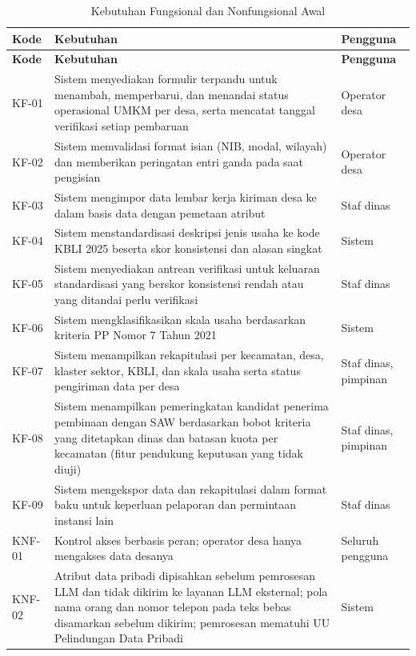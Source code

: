 {\footnotesize
\setlength{\tabcolsep}{4pt}
\renewcommand{\arraystretch}{1.15}
\begin{longtable}{|>{\centering\arraybackslash}p{}|L{0.62\textwidth}|L{0.20\textwidth}|}
\caption{Kebutuhan Fungsional dan Nonfungsional Awal}
\label{tab:kebutuhan}\\
\hline
\textbf{Kode} & \textbf{Kebutuhan} & \textbf{Pengguna} \\ \hline
\endfirsthead
\hline
\textbf{Kode} & \textbf{Kebutuhan} & \textbf{Pengguna} \\ \hline
\endhead
KF-01 & Sistem menyediakan formulir terpandu untuk menambah, memperbarui, dan menandai status operasional UMKM per desa, serta mencatat tanggal verifikasi setiap pembaruan & Operator desa \\ \hline
KF-02 & Sistem memvalidasi format isian (NIB, modal, wilayah) dan memberikan peringatan entri ganda pada saat pengisian & Operator desa \\ \hline
KF-03 & Sistem mengimpor data lembar kerja kiriman desa ke dalam basis data dengan pemetaan atribut & Staf dinas \\ \hline
KF-04 & Sistem menstandardisasi deskripsi jenis usaha ke kode KBLI 2025 beserta skor konsistensi dan alasan singkat & Sistem \\ \hline
KF-05 & Sistem menyediakan antrean verifikasi untuk keluaran standardisasi yang berskor konsistensi rendah atau yang ditandai perlu verifikasi & Staf dinas \\ \hline
KF-06 & Sistem mengklasifikasikan skala usaha berdasarkan kriteria PP Nomor 7 Tahun 2021 & Sistem \\ \hline
KF-07 & Sistem menampilkan rekapitulasi per kecamatan, desa, klaster sektor, KBLI, dan skala usaha serta status pengiriman data per desa & Staf dinas, pimpinan \\ \hline
KF-08 & Sistem menampilkan pemeringkatan kandidat penerima pembinaan dengan SAW berdasarkan bobot kriteria yang ditetapkan dinas dan batasan kuota per kecamatan (fitur pendukung keputusan yang tidak diuji) & Staf dinas, pimpinan \\ \hline
KF-09 & Sistem mengekspor data dan rekapitulasi dalam format baku untuk keperluan pelaporan dan permintaan instansi lain & Staf dinas \\ \hline
KNF-01 & Kontrol akses berbasis peran; operator desa hanya mengakses data desanya & Seluruh pengguna \\ \hline
KNF-02 & Atribut data pribadi dipisahkan sebelum pemrosesan LLM dan tidak dikirim ke layanan LLM eksternal; pola nama orang dan nomor telepon pada teks bebas disamarkan sebelum dikirim; pemrosesan mematuhi UU Pelindungan Data Pribadi \cite{uupdp2022} & Sistem \\ \hline

\end{longtable}}
